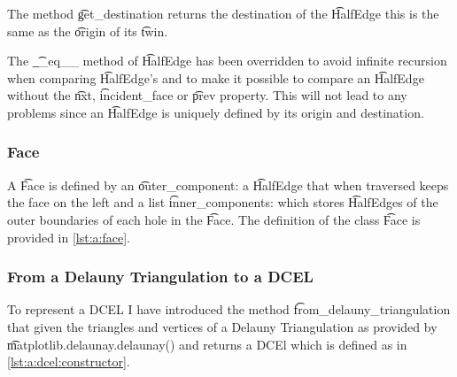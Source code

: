 	The method \t{get_destination} returns the destination of the \t{HalfEdge} this is the same as the \t{origin} of its \t{twin}.

	The \t{__eq__} method of \t{HalfEdge} has been overridden to avoid infinite recursion when comparing \t{HalfEdge}'s and to make it possible to compare an \t{HalfEdge} without the \t{nxt}, \t{incident_face} or \t{prev} property. This will not lead to any problems since an \t{HalfEdge} is uniquely defined by its origin and destination.
	

\subsubsection*{Face}
	A \t{Face} is defined by an \t{outer_component}: a \t{HalfEdge} that when traversed keeps the face on the left and a list \t{inner_components}: which stores \t{HalfEdge}s of the outer boundaries of each hole in the \t{Face}. The definition of the class \t{Face} is provided in \autoref{lst:a:face}. 
	

\subsubsection*{From a Delauny Triangulation to a DCEL}
	To represent a DCEL I have introduced the method \t{from_delauny_triangulation} that given the triangles and vertices of a Delauny Triangulation as provided by \t{matplotlib.delaunay.delaunay()} and returns a DCEl which is defined as in \autoref{lst:a:dcel:constructor}.

	

